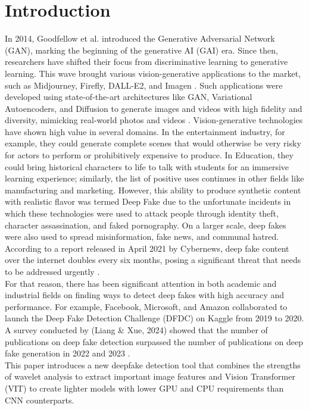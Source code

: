 \documentclass{svproc}
\begin{document}
\section{Introduction}
In 2014, Goodfellow et al. introduced the Generative Adversarial Network
(GAN), marking the beginning of the generative AI (GAI) era. Since then,
researchers have shifted their focus from discriminative learning to generative
learning. This wave brought various vision-generative applications to the
market, such as Midjourney, Firefly, DALL-E2, and Imagen
\cite{bengesi2024advancements}. Such applications were developed using
state-of-the-art architectures like GAN, Variational Autoencoders, and
Diffusion to generate images and videos with high fidelity and diversity,
mimicking real-world photos and videos \cite{raut2024generative}.
Vision-generative technologies have shown high value in several domains. In
the entertainment industry, for example, they could generate complete scenes
that would otherwise be very risky for actors to perform or prohibitively
expensive to produce. In Education, they could bring historical characters to
life to talk with students for an immersive learning experience; similarly, the
list of positive uses continues in other fields like manufacturing and
marketing. However, this ability to produce synthetic content with realistic
flavor was termed Deep Fake due to the unfortunate incidents in which these
technologies were used to attack people through identity theft, character
assassination, and faked pornography. On a larger scale, deep fakes were also
used to spread misinformation, fake news, and communal hatred.
According to a report released in April 2021 by Cybernews, deep fake
content over the internet doubles every six months, posing a significant threat
that needs to be addressed urgently \cite{patel2023deepfake}.
\\For that reason, there has been significant attention in both academic
and industrial fields on finding ways to detect deep fakes with high accuracy
and performance. For example, Facebook, Microsoft, and Amazon collaborated to
launch the Deep Fake Detection Challenge (DFDC) on Kaggle from 2019 to 2020. A
survey conducted by (Liang \& Xue, 2024) showed that the number of publications
on deep fake detection surpassed the number of publications on deep fake
generation in 2022 and 2023 \cite {gong2024contemporary}.
\\This paper introduces a new deepfake detection tool that combines the
strengths of wavelet analysis to extract important image features and Vision
Transformer (VIT) to create lighter models with lower GPU and CPU requirements
than CNN counterparts.
\end{document}
